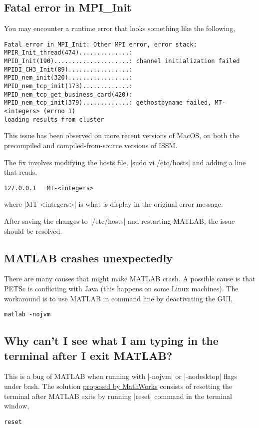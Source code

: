\subsection*{Fatal error in MPI\_Init}%
You may encounter a runtime error that looks something like the following,
\begin{lstlisting}
Fatal error in MPI_Init: Other MPI error, error stack:
MPIR_Init_thread(474)..............:
MPID_Init(190).....................: channel initialization failed
MPIDI_CH3_Init(89).................:
MPID_nem_init(320).................:
MPID_nem_tcp_init(173).............:
MPID_nem_tcp_get_business_card(420):
MPID_nem_tcp_init(379).............: gethostbyname failed, MT-<integers> (errno 1)
loading results from cluster
\end{lstlisting}
This issue has been observed on more recent versions of MacOS, on both the precompiled and compiled-from-source versions of ISSM.

The fix involves modifying the hosts file, \lstinlinebg|sudo vi /etc/hosts| and adding a line that reads,
\begin{lstlisting}
127.0.0.1	MT-<integers>
\end{lstlisting}
where \lstinlinebg|MT-<integers>| is what is display in the original error message.

After saving the changes to \lstinlinebg|/etc/hosts| and restarting MATLAB, the issue should be resolved.
\subsection*{MATLAB crashes unexpectedly}%
There are many causes that might make MATLAB crash. A possible cause is that PETSc is conflicting with Java (this happens on some Linux machines). The workaround is to use MATLAB in command line by deactivating the GUI,
\begin{lstlisting}
matlab -nojvm
\end{lstlisting}
\subsection*{Why can't I see what I am typing in the terminal after I exit MATLAB?}%
This is a bug of MATLAB when running with \lstinlinebg|-nojvm| or \lstinlinebg|-nodesktop| flags under bash. The solution \href{http://www.mathworks.com/support/solutions/en/data/1-CFTJX8/index.html?product=ML}{proposed by MathWorks} consists of resetting the terminal after MATLAB exits by running \lstinlinebg|reset| command in the terminal window,
\begin{lstlisting}
reset
\end{lstlisting}
